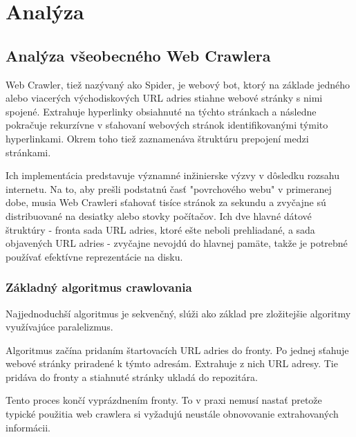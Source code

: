 

\chapter{Analýza}
\section{Analýza všeobecného Web Crawlera}

Web Crawler, tiež nazývaný ako Spider, je webový bot, ktorý na základe jedného alebo viacerých východiskových URL adries stiahne webové stránky s nimi spojené. Extrahuje hyperlinky obsiahnuté na týchto stránkach a následne pokračuje rekurzívne v sťahovaní webových stránok identifikovanými týmito hyperlinkami. Okrem toho tiež zaznamenáva štruktúru prepojení medzi stránkami. \cite{introToInfRetrieval}

Ich implementácia predstavuje významné inžinierske výzvy v dôsledku rozsahu internetu. Na to, aby prešli podstatnú časť "povrchového webu" v primeranej dobe, musia Web Crawleri sťahovať tisíce stránok za sekundu a zvyčajne sú distribuované na desiatky alebo stovky počítačov. Ich dve hlavné dátové štruktúry - fronta sada URL adries, ktoré ešte neboli prehliadané, a sada objavených URL adries - zvyčajne nevojdú do hlavnej pamäte, takže je potrebné používať efektívne reprezentácie na disku. \cite{encykOfDatabases}

\subsection{Základný algoritmus crawlovania}\label{sub:zakladnyAlgoritmusCrawlovania}
Najjednoduchší algoritmus je sekvenčný, slúži ako základ pre zložitejšie algoritmy využívajúce paralelizmus. 

Algoritmus začína pridaním štartovacích URL adries do fronty. Po jednej sťahuje webové stránky priradené k týmto adresám. Extrahuje z nich URL adresy. Tie pridáva do fronty a stiahnuté stránky ukladá do repozitára.

Tento proces končí vyprázdnením fronty. To v praxi nemusí nastať pretože typické použitia web crawlera si vyžadujú neustále obnovovanie extrahovaných informácii.


